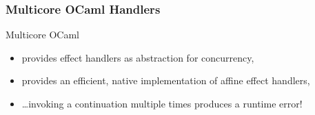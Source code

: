 \documentclass[10pt,compress]{beamer}
\begin{document}
\begin{frame}
  \frametitle{Multicore OCaml Handlers}
%
Multicore OCaml
\begin{itemize}
\item provides effect handlers as abstraction for concurrency,
\item provides an efficient, native implementation of affine effect handlers,
\item \dots invoking a continuation multiple times produces a runtime error!
\end{itemize}










\end{frame}
\end{document}
